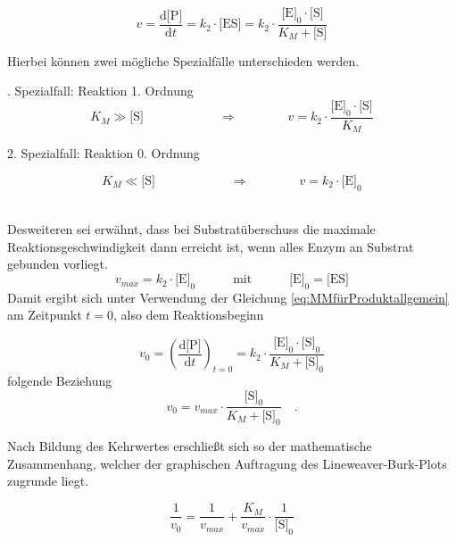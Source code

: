 \begin{equation}
v=\frac{\text{d[P]}}{\text{d}t}=k_2\cdot\text{[ES]} =k_2\cdot \frac{\text{[E]}_0\cdot\text{[S]}}{K_M+\text{[S]}}
\label{eq:MMfürProduktallgemein}
\end{equation}


Hierbei können zwei mögliche Spezialfälle unterschieden werden.
\\
\par
\begingroup
\leftskip=1cm %
. Spezialfall: Reaktion 1. Ordnung
\begin{equation}
K_M \gg \text{[S]}\quad\quad\quad\quad\quad\quad \Longrightarrow \quad\quad\quad\quad v=k_2\cdot \frac{\text{[E]}_0\cdot\text{[S]}}{K_M}
\end{equation}

2. Spezialfall: Reaktion 0. Ordnung

\begin{equation}
K_M \ll \text{[S]}\quad\quad\quad\quad\quad\quad \Longrightarrow \quad\quad\quad\quad v=k_2\cdot \text{[E]}_0
\label{eq:Grenzfall}
\end{equation}
\\
\par
\endgroup
Desweiteren sei erwähnt, dass bei Substratüberschuss die maximale Reaktionsgeschwindigkeit dann erreicht ist, wenn alles Enzym an Substrat gebunden vorliegt.
\begin{equation}
v_{max}=k_2\cdot\text{[E]}_0\quad\quad\quad \text{mit}\quad\quad\quad\text{[E]}_0=\text{[ES]}
\label{eq:vmaxmitk2}
\end{equation}
Damit ergibt sich unter Verwendung der Gleichung \ref{eq:MMfürProduktallgemein} 
am Zeitpunkt $t=0$, also dem Reaktionsbeginn 

\begin{equation}
v_0=\left(\frac{\text{d[P]}}{\text{d}t}\right)_{t=0}=k_2\cdot \frac{\text{[E]}_0\cdot\text{[S]}_0}{K_M+\text{[S]}_0}
\label{eq:MMfürProduktbeinull}
\end{equation}
 folgende Beziehung
\begin{equation}
v_0=v_{max}\cdot \frac{\text{[S]}_0}{K_M+\text{[S]}_0}\quad\text{.}
\end{equation}

Nach Bildung des Kehrwertes erschließt sich so der mathematische Zusammenhang, welcher der graphischen Auftragung des Lineweaver-Burk-Plots zugrunde liegt.

\begin{equation}
\frac{1}{v_{0}}=\frac{1}{v_{max}}+\frac{K_M}{v_{max}}\cdot \frac{1}{\text{[S]}_0}
\label{eq:lineweaverPlot}
\end{equation}